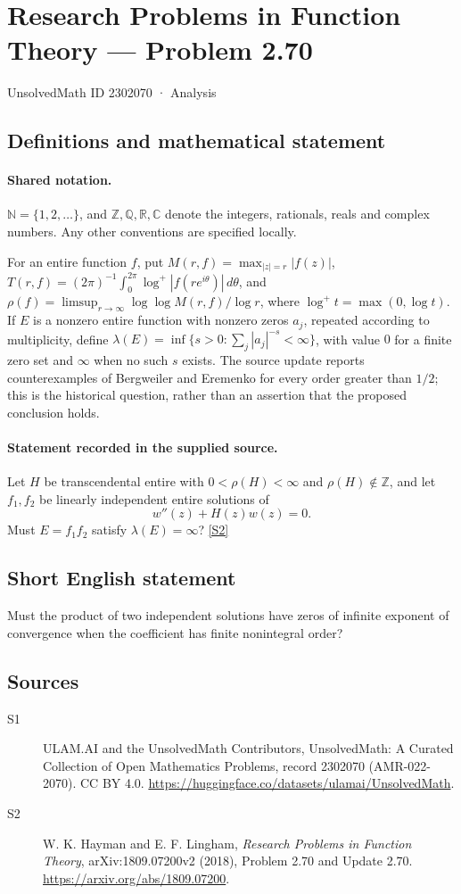 \documentclass[11pt]{article}
\newcommand{\sref}[2]{\hyperlink{source:#1:#2}{[S#2]}}
\begin{document}
\setcounter{section}{2302069}
\section{Research Problems in Function Theory — Problem 2.70}\label{2302070}
{\small\sffamily UnsolvedMath ID 2302070 · Analysis}
\subsection{Definitions and mathematical statement}

\paragraph{Shared notation.}$\mathbb N=\{1,2,\ldots\}$, and $\mathbb Z,\mathbb Q,\mathbb R,\mathbb C$ denote the integers, rationals, reals and complex numbers. Any other conventions are specified locally.


For an entire function $f$, put $M(r,f)=\max_{|z|=r}|f(z)|$, $T(r,f)=(2\pi)^{-1}\int_0^{2\pi}\log^+|f(re^{i\theta})|\,d\theta$, and $\rho(f)=\limsup_{r\to\infty}\log\log M(r,f)/\log r$, where $\log^+t=\max(0,\log t)$. If $E$ is a nonzero entire function with nonzero zeros $a_j$, repeated according to multiplicity, define $\lambda(E)=\inf\{s>0:\sum_j|a_j|^{-s}<\infty\}$, with value $0$ for a finite zero set and $\infty$ when no such $s$ exists.
The source update reports counterexamples of Bergweiler and Eremenko for every order greater than $1/2$; this is the historical question, rather than an assertion that the proposed conclusion holds.
\paragraph{Statement recorded in the supplied source.}
Let $H$ be transcendental entire with $0<\rho(H)<\infty$ and $\rho(H)\notin\mathbb Z$, and let $f_1,f_2$ be linearly independent entire solutions of
\[w''(z)+H(z)w(z)=0.\]
Must $E=f_1f_2$ satisfy $\lambda(E)=\infty$? \sref{2302070}{2}
\subsection{Short English statement}
Must the product of two independent solutions have zeros of infinite exponent of convergence when the coefficient has finite nonintegral order?
\subsection{Sources}
\begin{description}
\item[\hypertarget{source:2302070:1}{S1}] ULAM.AI and the UnsolvedMath Contributors, UnsolvedMath: A Curated Collection of Open Mathematics Problems, record 2302070 (AMR-022-2070). CC BY 4.0. \url{https://huggingface.co/datasets/ulamai/UnsolvedMath}.
\item[\hypertarget{source:2302070:2}{S2}] W. K. Hayman and E. F. Lingham, \emph{Research Problems in Function Theory}, arXiv:1809.07200v2 (2018), Problem 2.70 and Update 2.70. \url{https://arxiv.org/abs/1809.07200}.
\end{description}
\label{end:2302070}
\end{document}
